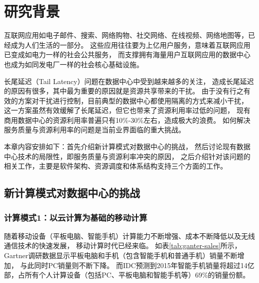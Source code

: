 

\chapter{研究背景}
\label{chap:background}

互联网应用如电子邮件、搜索、网络购物、社交网络、在线视频、网络地图等，已经成为人们生活的一部分。
这些应用往往要为上亿用户服务，意味着互联网应用已变成如电力一样的社会公共服务，
而支撑拥有海量用户互联网应用的数据中心也成为如同发电厂一样的社会核心基础设施。

长尾延迟（Tail Latency）问题在数据中心中受到越来越多的关注，
造成长尾延迟的原因有很多，其中最为重要的原因就是资源共享带来的干扰。
由于没有行之有效的方案对干扰进行控制，目前典型的数据中心都使用隔离的方式来减小干扰，
这一方案虽然有效缓解了长尾延迟，但它也带来了资源利用率过低的问题，
现有商用数据中心的资源利用率普遍只有10\%-30\%左右，造成极大的浪费。
如何解决服务质量与资源利用率的问题是当前业界面临的重大挑战。

本章内容安排如下：首先介绍新计算模式对数据中心的挑战，
然后讨论现有数据中心技术的局限性，即服务质量与资源利率冲突的原因，
之后介绍针对该问题的相关工作，主要是软件架构、资源调度和体系结构支持三个方面的工作。

%

\section{新计算模式对数据中心的挑战}

\subsection*{计算模式1：以云计算为基础的移动计算}

随着移动设备（平板电脑、智能手机）计算能力不断增强、成本不断降低以及无线通信技术的快速发展，
移动计算时代已经来临。
如表\ref{tab:ganter-sales}所示，Gartner调研数据显示平板电脑和手机（包含智能手机和普通手机）销量不断增加，
与此同时PC销量则不断下降。
而IDC预测到2015年智能手机销量将超过14亿部，占所有个人计算设备（包括PC、平板电脑和智能手机等）69\%的销量份额。

